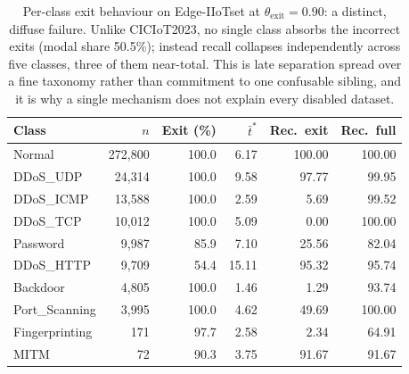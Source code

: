 \begin{table}[!t]
\centering
\caption{Per-class exit behaviour on Edge-IIoTset at $\theta_\mathrm{exit}=0.90$:
a distinct, diffuse failure. Unlike CICIoT2023, no single class absorbs the
incorrect exits (modal share 50.5\%); instead recall collapses independently
across five classes, three of them near-total. This is late separation spread over
a fine taxonomy rather than commitment to one confusable sibling, and it is why a
single mechanism does not explain every disabled dataset.}
\label{tab:dep:edgeiiot_perclass}
\small
\begin{tabular}{lrrrrr}
\toprule
Class & $n$ & Exit (\%) & $\bar{t}^*$ & Rec.\ exit & Rec.\ full \\
\midrule
Normal         & 272,800 & 100.0 &  6.17 & 100.00 & 100.00 \\
DDoS\_UDP      &  24,314 & 100.0 &  9.58 &  97.77 &  99.95 \\
DDoS\_ICMP     &  13,588 & 100.0 &  2.59 &   5.69 &  99.52 \\
DDoS\_TCP      &  10,012 & 100.0 &  5.09 &   0.00 & 100.00 \\
Password       &   9,987 &  85.9 &  7.10 &  25.56 &  82.04 \\
DDoS\_HTTP     &   9,709 &  54.4 & 15.11 &  95.32 &  95.74 \\
Backdoor       &   4,805 & 100.0 &  1.46 &   1.29 &  93.74 \\
Port\_Scanning &   3,995 & 100.0 &  4.62 &  49.69 & 100.00 \\
Fingerprinting &     171 &  97.7 &  2.58 &   2.34 &  64.91 \\
MITM           &      72 &  90.3 &  3.75 &  91.67 &  91.67 \\
\bottomrule
\end{tabular}
\end{table}

